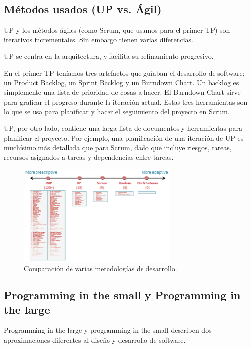 \subsection{Métodos usados (UP vs. Ágil)}

UP y los métodos ágiles (como Scrum, que usamos para el primer TP) son iterativos incrementales. Sin embargo tienen varias diferencias.

UP se centra en la arquitectura, y facilita su refinamiento progresivo.

En el primer TP teníamos tres artefactos que guíaban el desarrollo de software: un Product Backlog, un Sprint Backlog y un Burndown Chart. Un backlog es simplemente una lista de prioridad de cosas a hacer. El Burndown Chart sirve para graficar el progreso durante la iteración actual. Estas tres herramientas son lo que se usa para planificar y hacer el seguimiento del proyecto en Scrum.

UP, por otro lado, contiene una larga lista de documentos y herramientas para planificar el proyecto. Por ejemplo, una planificación de una iteración de UP es muchísimo más detallada que para Scrum, dado que incluye riesgos, tareas, recursos asignados a tareas y dependencias entre tareas.


\begin{figure}[H]
  \centering
  \includegraphics[width=0.7\textwidth]{img/up-agile.png}
  \caption{\normalfont Comparación de varias metodologías de desarrollo.}
\end{figure} 

\subsection{Programming in the small y Programming in the large}

Programming in the large y programming in the small describen dos aproximaciones diferentes al diseño y desarrollo de software. 


